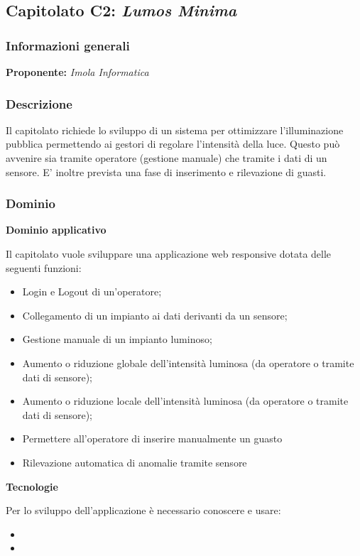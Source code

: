 \subsection{Capitolato C2: \textit{Lumos Minima}}
\subsubsection{Informazioni generali}
\textbf{Proponente:} \textit{Imola Informatica}
\subsubsection{Descrizione}
Il capitolato richiede lo sviluppo di un sistema per ottimizzare l'illuminazione pubblica permettendo ai gestori di regolare l'intensità della luce. Questo può avvenire sia tramite operatore (gestione manuale)
che tramite i dati di un sensore. E' inoltre prevista una fase di inserimento e rilevazione di guasti.

\subsubsection{Dominio}

\textbf{Dominio applicativo}

Il capitolato vuole sviluppare una applicazione web responsive dotata delle seguenti funzioni:
\begin{itemize}
    \item Login e Logout di un'operatore;
    \item Collegamento di un impianto ai dati derivanti da un sensore;
    \item Gestione manuale di un impianto luminoso;
    \item Aumento o riduzione globale dell'intensità luminosa (da operatore o tramite dati di sensore);
    \item Aumento o riduzione locale dell'intensità luminosa (da operatore o tramite dati di sensore);
    \item Permettere all'operatore di inserire manualmente un guasto
    \item Rilevazione automatica di anomalie tramite sensore
\end{itemize}

\textbf{Tecnologie}

Per lo sviluppo dell'applicazione è necessario conoscere e usare:
\begin{itemize}
    \item %
    \item %
\end{itemize}



